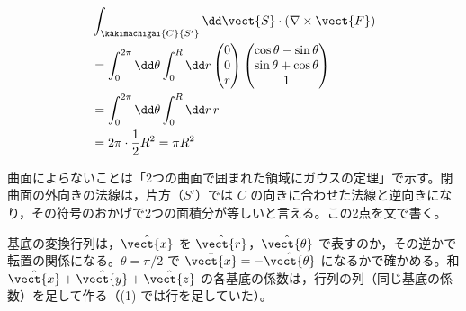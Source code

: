 \begin{align*}
&\int_{\kakimachigai{C}{S'}}\dd\vect{S}\cdot(\nabla\times\vect{F})\\
&=\int_{0}^{2\pi}\dd\theta\int_{0}^{R}\dd r\begin{pmatrix}0\\0\\r\end{pmatrix}\begin{pmatrix}\cos\theta-\sin\theta\\\sin\theta+\cos\theta\\1\end{pmatrix}\\
&=\int_{0}^{2\pi}\dd\theta\int_{0}^{R}\dd r\,r\\
&=2\pi\cdot\frac{1}{2}R^{2}=\pi R^{2}
\end{align*}
\item 曲面によらないことは「2つの曲面で囲まれた領域にガウスの定理」で示す。閉曲面の外向きの法線は，片方（$S'$）では $C$ の向きに合わせた法線と逆向きになり，その符号のおかげで2つの面積分が等しいと言える。この2点を文で書く。
\item 基底の変換行列は，$\hat{\vect{x}}$ を $\hat{\vect{r}}$，$\hat{\vect{\theta}}$ で表すのか，その逆かで転置の関係になる。$\theta=\pi/2$ で $\hat{\vect{x}}=-\hat{\vect{\theta}}$ になるかで確かめる。和 $\hat{\vect{x}}+\hat{\vect{y}}+\hat{\vect{z}}$ の各基底の係数は，行列の列（同じ基底の係数）を足して作る（(1) では行を足していた）。

